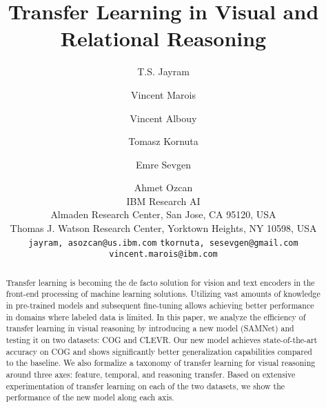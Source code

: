 \documentclass[10pt,twocolumn,letterpaper]{article}
\theoremstyle{remark}
\begin{document}
\title{Transfer Learning in Visual and Relational Reasoning}

\author{T.S. Jayram \and  Vincent Marois \and Vincent Albouy \and Tomasz Kornuta  \and Emre Sevgen \and Ahmet Ozcan\\
IBM Research AI\\
Almaden Research Center, San Jose, CA 95120, USA\\
Thomas J. Watson Research Center, Yorktown Heights, NY 10598, USA\\
{\tt\small {jayram,  asozcan}@us.ibm.com}
{\tt\small {tkornuta, sesevgen}@gmail.com}
{\tt\small vincent.marois@ibm.com}
}

\maketitle

\begin{abstract}
  Transfer learning is becoming the de facto solution for vision and text encoders in the front-end processing of machine learning solutions. Utilizing vast amounts of knowledge in pre-trained models and subsequent fine-tuning allows achieving better performance in domains where labeled data is limited. In this paper, we analyze the efficiency of transfer learning in visual reasoning by introducing a new model (SAMNet) and testing it on two datasets: COG and CLEVR.  Our new model achieves state-of-the-art accuracy on COG and shows significantly better generalization capabilities compared to the baseline. We also formalize a taxonomy of transfer learning for visual reasoning around three axes: feature, temporal, and reasoning transfer. Based on extensive experimentation of transfer learning on each of the two datasets, we show the performance of the new model along each axis.
\end{abstract}













\clearpage
{\small


}

%
\end{document}

